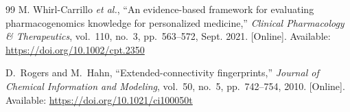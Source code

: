 \begin{thebibliography}{99}
M. Whirl-Carrillo \textit{et al.},
``An evidence-based framework for evaluating pharmacogenomics knowledge for personalized medicine,''
\textit{Clinical Pharmacology \& Therapeutics}, vol.~110, no.~3, pp.~563--572, Sept. 2021.
[Online]. Available: \url{https://doi.org/10.1002/cpt.2350}

D.~Rogers and M.~Hahn,
``Extended-connectivity fingerprints,''
\textit{Journal of Chemical Information and Modeling}, vol.~50, no.~5, pp.~742--754, 2010.
[Online]. Available: \url{https://doi.org/10.1021/ci100050t}



\end{thebibliography}